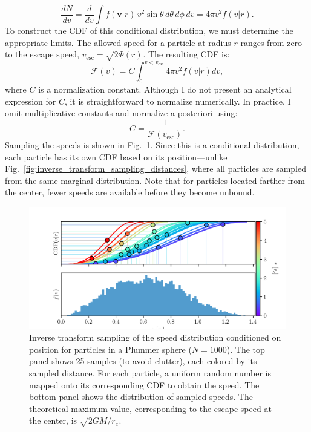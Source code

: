             \begin{equation}
                \frac{dN}{dv} = \frac{d}{dv} \int f(\textbf{v}|r)\, v^2 \sin\theta\, d\theta\, d\phi\, dv = 4\pi v^2 f(v|r).
            \end{equation}
            To construct the CDF of this conditional distribution, we must determine the appropriate limits. The allowed speed for a particle at radius $r$ ranges from zero to the escape speed, $v_{\mathrm{esc}} = \sqrt{2\Phi(r)}$. The resulting CDF is:
            \begin{equation}
                \mathcal{F}(v) = C \int_0^{v < v_\mathrm{esc}} 4\pi v^2 f(v|r) dv,
            \end{equation}
            where $C$ is a normalization constant. Although I do not present an analytical expression for $C$, it is straightforward to normalize numerically. In practice, I omit multiplicative constants and normalize a posteriori using:
            \begin{equation}
                C = \frac{1}{\mathcal{F}(v_\mathrm{esc})}.
            \end{equation}
            Sampling the speeds is shown in Fig.~\ref{fig:inverse_transform_sampling_velocities}. Since this is a conditional distribution, each particle has its own CDF based on its position—unlike Fig.~\ref{fig:inverse_transform_sampling_distances}, where all particles are sampled from the same marginal distribution. Note that for particles located farther from the center, fewer speeds are available before they become unbound.
            \begin{figure}
                \includegraphics[width=\linewidth]{images/inverse_transform_sampling_velocities.png}
                \caption{Inverse transform sampling of the speed distribution conditioned on position for particles in a Plummer sphere ($N = 1000$). The top panel shows 25 samples (to avoid clutter), each colored by its sampled distance. For each particle, a uniform random number is mapped onto its corresponding CDF to obtain the speed. The bottom panel shows the distribution of sampled speeds. The theoretical maximum value, corresponding to the escape speed at the center, is $\sqrt{2GM/r_c}$.}
                \label{fig:inverse_transform_sampling_velocities}
            \end{figure}
